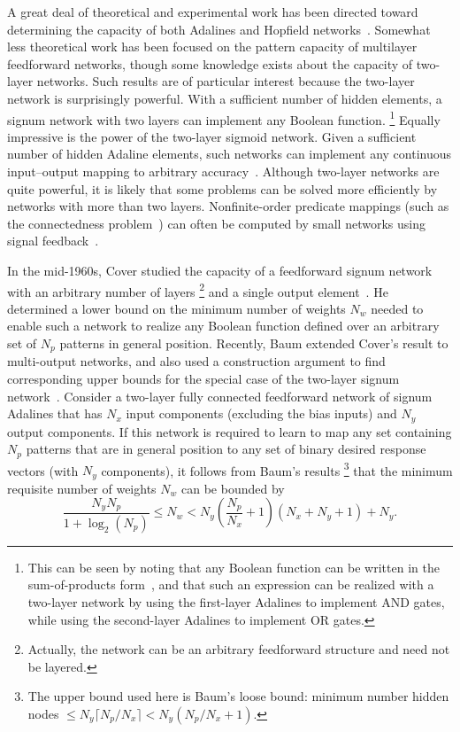 \documentclass[10pt,twocolumn]{article}
\begin{document}
A great deal of theoretical and experimental work has been directed toward
determining the capacity of both Adalines and Hopfield
networks~\cite{newman,abu88,abu86,venkatesh}. Somewhat less theoretical work has
been focused on the pattern capacity of multilayer feedforward networks, though
some knowledge exists about the capacity of two-layer networks. Such results are
of particular interest because the two-layer network is surprisingly powerful.
With a sufficient number of hidden elements, a signum network with two layers can
implement any Boolean function.%
\footnote{This can be seen by noting that any Boolean function can be written in
the sum-of-products form~\cite{greenfield}, and that such an expression can be
realized with a two-layer network by using the first-layer Adalines to implement
AND gates, while using the second-layer Adalines to implement OR gates.}
Equally impressive is the power of the two-layer sigmoid network. Given a
sufficient number of hidden Adaline elements, such networks can implement any
continuous input--output mapping to arbitrary
accuracy~\cite{stinchombe,cybenko88,irie}. Although two-layer networks are quite
powerful, it is likely that some problems can be solved more efficiently by
networks with more than two layers. Nonfinite-order predicate mappings (such as
the connectedness problem~\cite{minsky}) can often be computed by small networks
using signal feedback~\cite{roth}.

In the mid-1960s, Cover studied the capacity of a feedforward signum network with
an arbitrary number of layers%
\footnote{Actually, the network can be an arbitrary feedforward structure and
need not be layered.}
and a single output element~\cite{cover64,cover68}. He determined a lower bound
on the minimum number of weights $N_w$ needed to enable such a network to realize
any Boolean function defined over an arbitrary set of $N_p$ patterns in general
position. Recently, Baum extended Cover's result to multi-output networks, and
also used a construction argument to find corresponding upper bounds for the
special case of the two-layer signum network~\cite{baum88}. Consider a two-layer
fully connected feedforward network of signum Adalines that has $N_x$ input
components (excluding the bias inputs) and $N_y$ output components. If this
network is required to learn to map any set containing $N_p$ patterns that are in
general position to any set of binary desired response vectors (with $N_y$
components), it follows from Baum's results%
\footnote{The upper bound used here is Baum's loose bound: minimum number hidden
nodes $\le N_y\lceil N_p/N_x\rceil < N_y(N_p/N_x + 1)$.}
that the minimum requisite number of weights $N_w$ can be bounded by
\begin{equation}
\frac{N_y N_p}{1+\log_2(N_p)} \le N_w < N_y\!\left(\frac{N_p}{N_x}+1\right)(N_x+N_y+1)+N_y. \tag{8}
\end{equation}
\end{document}

